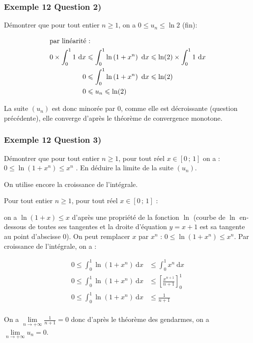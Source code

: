 \documentclass[11pt, hyperref={urlcolor=red,%
            linkcolor=blue, %
            colorlinks=true}]{beamer}
\newcommand{\Interff}[2]{\left[#1\, ;\, #2\right]}
\newcommand{\limitesuite}[1]{\lim\limits
_{n \to +\infty} #1}
\newcommand{\suite}[1]{\ensuremath{\left(#1_{n}\right)}}
\newcommand{\dx}{\ensuremath{\text{d}x}}		%
\newcommand{\integralex}[3]{\int_{#1}^{#2} #3 \ \dx}
\begin{document}
\begin{frame}
\frametitle{Exemple  12 Question 2)}
Démontrer que pour tout entier $n \geqslant 1$, on a $0 \leqslant u_{n} \leqslant \ln 2$ (fin):

\pause \begin{align*}
\intertext{par linéarité : }
 0 \times \integralex{0}{1}{1} & \leqslant \integralex{0}{1}{\ln\left(1+x^{n}\right)}  \leqslant \ln(2) \times \integralex{0}{1}{1} \\
0 & \leqslant \integralex{0}{1}{\ln\left(1+x^{n}\right)}  \leqslant \ln(2)  \\
0 & \leqslant u_{n}  \leqslant \ln(2)
\end{align*}

La suite $\suite{u}$ est donc minorée par $0$, comme elle est décroissante (question précédente), elle converge d'après le théorème de convergence monotone.




\end{frame}





\begin{frame}
\frametitle{Exemple  12 Question 3)}
Démontrer que pour tout entier $n \geqslant 1$, pour tout réel $x \in \Interff{0}{1}$ on a : $0 \leqslant \ln\left(1+x^n\right) \leqslant  x^n  $ . En déduire la limite de la  suite $\suite{u}$.

On utilise encore la croissance de l'intégrale.

Pour tout entier $n \geqslant 1$, pour tout réel $x \in \Interff{0}{1}$ :

on a $\ln(1+x) \leqslant x$  d'après une propriété de la fonction $\ln$ (courbe de $\ln$ en-dessous de toutes ses tangentes et la droite d'équation $y=x+1$ est sa tangente au point d'abscisse $0$). On peut remplacer $x$ par $x^{n}$  : $0 \leqslant \ln(1+x^{n}) \leqslant x^{n}$. Par croissance de l'intégrale, on a :

\pause \begin{align*}
0 \leqslant \integralex{0}{1}{\ln(1+x^{n}) } & \leqslant \integralex{0}{1}{x^{n}} \\
0 \leqslant \integralex{0}{1}{\ln(1+x^{n}) } & \leqslant \left[\frac{x^{n+1}}{n+1} \right]_{0}^{1} \\
0 \leqslant \integralex{0}{1}{\ln(1+x^{n}) } & \leqslant \frac{1}{n+1}\\
\end{align*}

On a $\limitesuite{\frac{1}{n+1}}=0$ donc d'après le théorème des gendarmes, on a $\limitesuite{u_{n}}=0$.




\end{frame}
\end{document}
